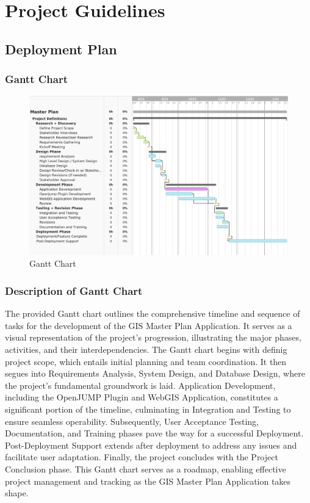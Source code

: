 
\chapter{Project Guidelines}
\label{ch:project_guidelines}

\section{Deployment Plan}\label{sec:deployment-plan}
\subsection{Gantt Chart}\label{subsec:gantt-chart}
\begin{figure}[H]
    \centering
    \includegraphics[width=\textwidth]{res/gantt_chart}
    \caption{Gantt Chart}
    \label{fig:gantt-chart}
\end{figure}

\subsection{Description of Gantt Chart}\label{subsec:description-of-gantt-chart}
The provided Gantt chart outlines the comprehensive timeline and sequence of tasks for the development of the GIS Master Plan Application. It serves as a visual representation of the project's progression, illustrating the major phases, activities, and their interdependencies. The Gantt chart begins with definig project scope, which entails initial planning and team coordination. It then segues into Requirements Analysis, System Design, and Database Design, where the project's fundamental groundwork is laid. Application Development, including the OpenJUMP Plugin and WebGIS Application, constitutes a significant portion of the timeline, culminating in Integration and Testing to ensure seamless operability. Subsequently, User Acceptance Testing, Documentation, and Training phases pave the way for a successful Deployment. Post-Deployment Support extends after deployment to address any issues and facilitate user adaptation. Finally, the project concludes with the Project Conclusion phase. This Gantt chart serves as a roadmap, enabling effective project management and tracking as the GIS Master Plan Application takes shape.

